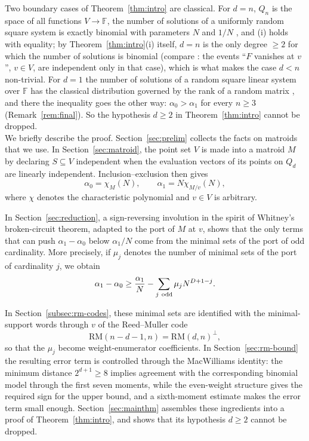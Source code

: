 \documentclass[11pt,a4paper]{article}
\theoremstyle{definition}
\newcommand{\FF}{\mathbb{F}}
\newcommand{\RM}{\mathrm{RM}}
\begin{document}
Two boundary cases of Theorem~\ref{thm:intro} are classical. For
$d=n$, $Q_n$ is the space of all functions $V\to\FF$, the number of
solutions of a uniformly random square system is exactly binomial with
parameters $N$ and $1/N$ \cite[Theorem~1]{jain}, and (i) holds with
equality; by Theorem~\ref{thm:intro}(i) itself, $d=n$ is the only
degree $\ge2$ for which the number of solutions is binomial (compare
\cite[Corollary~3.6]{jain}: the events ``$F$ vanishes at $v$'', $v\in
V$, are independent only in that case), which is what makes the case
$d<n$ non-trivial. For $d=1$ the number of solutions of a random
square linear system over $\FF$ has the classical distribution
governed by the rank of a random matrix \cite[Chapter~3]{kolchin},
and there the inequality goes the other way: $\alpha_0>\alpha_1$ for
every $n\ge3$ (Remark~\ref{rem:final}). So the hypothesis $d\ge2$ in
Theorem~\ref{thm:intro} cannot be dropped.
\\

We briefly describe the proof. Section~\ref{sec:prelim} collects the facts on matroids that we use. In Section~\ref{sec:matroid}, the point set $V$ is made
into a matroid $M$ by declaring $S\subseteq V$
independent when the evaluation vectors of its points on $Q_d$ are
linearly independent. Inclusion--exclusion then gives
\[
\alpha_0=\chi_M(N),
\qquad
\alpha_1=N\chi_{M/v}(N),
\]
where $\chi$ denotes the characteristic polynomial and $v\in V$ is
arbitrary.

In Section~\ref{sec:reduction}, a sign-reversing involution in the
spirit of Whitney's broken-circuit theorem, adapted to the port of $M$
at $v$, shows that the only terms that can push
$\alpha_1-\alpha_0$ below $\alpha_1/N$ come from the minimal sets of
the port of odd cardinality. More precisely, if $\mu_j$ denotes the
number of minimal sets of the port of cardinality $j$, we obtain
\[
\alpha_1-\alpha_0
\ge
\frac{\alpha_1}{N}
-
\sum_{j\ {\rm odd}}\mu_jN^{D+1-j}.
\]

In Section~\ref{subsec:rm-codes}, these minimal sets are identified
with the minimal-support words through $v$ of the Reed--Muller code
\[
\RM(n-d-1,n)=\RM(d,n)^\perp,
\]
so that the $\mu_j$ become weight-enumerator coefficients. In
Section~\ref{sec:rm-bound} the resulting error term is controlled through the
MacWilliams identity: the minimum distance $2^{d+1}\ge8$ implies agreement with
the corresponding binomial model through the first seven moments, while the
even-weight structure gives the required sign for the upper bound, and a
sixth-moment estimate makes the error term small enough.
Section~\ref{sec:mainthm} assembles these ingredients into a proof of
Theorem~\ref{thm:intro}, and shows that its hypothesis $d\ge2$ cannot be
dropped.
\end{document}
